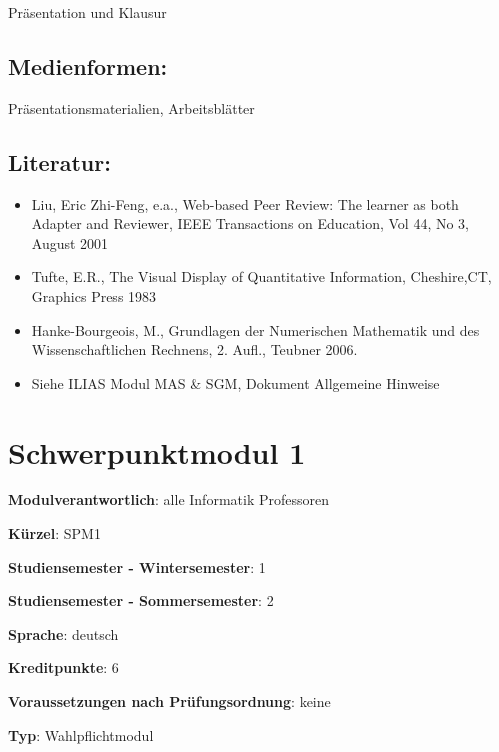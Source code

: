 Präsentation und Klausur

\section*{Medienformen:}\label{medienformen-2}

Präsentationsmaterialien, Arbeitsblätter

\section*{Literatur:}\label{literatur-2}

\begin{itemize}
\tightlist
\item
  Liu, Eric Zhi-Feng, e.a., Web-based Peer Review: The learner as both
  Adapter and Reviewer, IEEE Transactions on Education, Vol 44, No 3,
  August 2001
\item
  Tufte, E.R., The Visual Display of Quantitative Information,
  Cheshire,CT, Graphics Press 1983
\item
  Hanke-Bourgeois, M., Grundlagen der Numerischen Mathematik und des
  Wissenschaftlichen Rechnens, 2. Aufl., Teubner 2006.
\item
  Siehe ILIAS Modul MAS \& SGM, Dokument Allgemeine Hinweise
\end{itemize}

\chapter{Schwerpunktmodul 1}\label{schwerpunktmodul-1}

\begin{modulHead}
\textbf{Modulverantwortlich}: alle Informatik
Professoren
\end{modulHead}
\begin{modulHead}
\textbf{Kürzel}:
SPM1
\end{modulHead}
\begin{modulHead}
\textbf{Studiensemester -
Wintersemester}:
1
\end{modulHead}
\begin{modulHead}
\textbf{Studiensemester -
Sommersemester}: 2
\end{modulHead}
\begin{modulHead}
\textbf{Sprache}:
deutsch
\end{modulHead}
\begin{modulHead}
\textbf{Kreditpunkte}:
6
\end{modulHead}
\begin{modulHead}
\textbf{Voraussetzungen nach
Prüfungsordnung}: keine
\end{modulHead}
\begin{modulHead}
\textbf{Typ}:
Wahlpflichtmodul
\end{modulHead}


